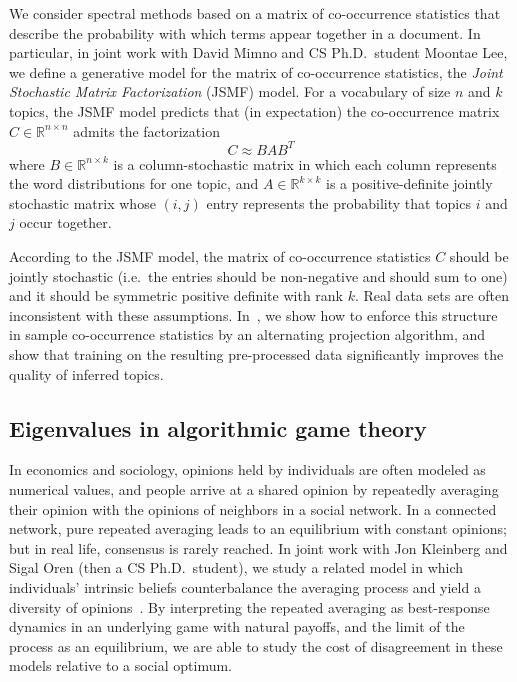 \documentclass{amsart}
\newcommand{\bbR}{\mathbb{R}}
\begin{document}
We consider spectral methods
based on a matrix of co-occurrence statistics that
describe the probability with which terms appear together in a document.
In particular, in joint work with David Mimno and CS Ph.D.~student
Moontae Lee, we define a generative model for the matrix of
co-occurrence statistics, the {\em Joint Stochastic Matrix
Factorization} (JSMF) model.  For a vocabulary of size $n$ and $k$
topics, the JSMF model predicts that (in expectation) the
co-occurrence matrix $C\in \bbR^{n \times n}$ admits the
factorization
\[
  C \approx B A B^T
\]
where $B \in \bbR^{n \times k}$ is
a column-stochastic matrix in which each column represents the word
distributions for one topic, and $A \in \bbR^{k \times k}$ is a
positive-definite jointly stochastic matrix whose $(i,j)$ entry
represents the probability that topics $i$ and $j$ occur together.

According to the JSMF model, the matrix of co-occurrence statistics $C$
should be jointly stochastic (i.e.~the entries should be non-negative
and should sum to one) and it should be symmetric positive definite with
rank $k$.  Real data sets are often inconsistent with these assumptions.
In~\cite{2015-nips}, we show how to enforce this structure in
sample co-occurrence statistics by an alternating projection algorithm,
and show that training on the resulting pre-processed data significantly
improves the quality of inferred topics.

\subsection*{Eigenvalues in algorithmic game theory}

In economics and sociology, opinions held by individuals are often
modeled as numerical values, and people arrive at a shared opinion by
repeatedly averaging their opinion with the opinions of neighbors in a
social network.  In a connected network, pure repeated averaging leads
to an equilibrium with constant opinions; but in
real life, consensus is rarely reached. In joint work with Jon
Kleinberg and Sigal Oren (then a CS Ph.D.~student),
we study a related model in which individuals’ intrinsic beliefs
counterbalance the averaging process and yield a diversity of opinions~\cite{2011-focs,2015-geb}.
By interpreting the repeated averaging as best-response dynamics in an
underlying game with natural payoffs, and the limit of the process as an
equilibrium, we are able to study the cost of disagreement in these
models relative to a social optimum.
\end{document}
